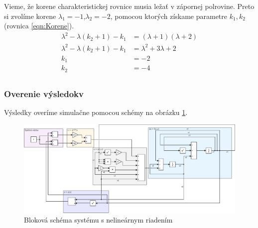 \documentclass[../main.tex]{subfiles}
\begin{document}
Vieme, že korene charakteristickej rovnice musia ležať v zápornej polrovine. Preto si zvolíme korene $\lambda_1 = -1$,$\lambda_2 = -2$, pomocou ktorých získame parametre $k_1,k_2$ (rovnica \ref{eqn:Korene}).
\begin{equation}
\begin{aligned} 
\lambda^2 - \lambda(k_2+1) - k_1 & = (\lambda + 1)(\lambda + 2)\\ 
\lambda^2 - \lambda(k_2+1) - k_1 & = \lambda^2 + 3\lambda + 2\\ 
k_1 &= -2\\
k_2 &= -4\\
\end{aligned}
\label{eqn:Korene}
\end{equation}

\subsubsection{Overenie výsledokv}
Výsledky overíme simulačne pomocou schémy na obrázku \ref{fig:PrikladsRiadenim}.
\newpage
\begin{figure}[H]
	\begin{center}\includegraphics[scale=0.8,angle=90]{Rovnica1MVS.pdf}\end{center}
	\caption{Bloková schéma systému s nelineárnym riadením}
	\label{fig:PrikladsRiadenim}
\end{figure}
\end{document}
